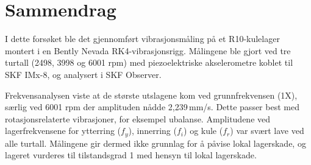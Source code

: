 \section*{Sammendrag}
I dette forsøket ble det gjennomført vibrasjonsmåling på et R10-kulelager montert i en Bently Nevada RK4-vibrasjonsrigg. Målingene ble gjort ved tre turtall (2498, 3998 og 6001 rpm) med piezoelektriske akselerometre koblet til SKF IMx-8, og analysert i SKF Observer.

Frekvensanalysen viste at de største utslagene kom ved grunnfrekvensen (1X), særlig ved 6001 rpm der amplituden nådde 2{,}239\,mm/s. Dette passer best med rotasjonsrelaterte vibrasjoner, for eksempel ubalanse. Amplitudene ved lagerfrekvensene for ytterring ($f_y$), innerring ($f_i$) og kule ($f_r$) var svært lave ved alle turtall. Målingene gir dermed ikke grunnlag for å påvise lokal lagerskade, og lageret vurderes til tilstandsgrad 1 med hensyn til lokal lagerskade.
